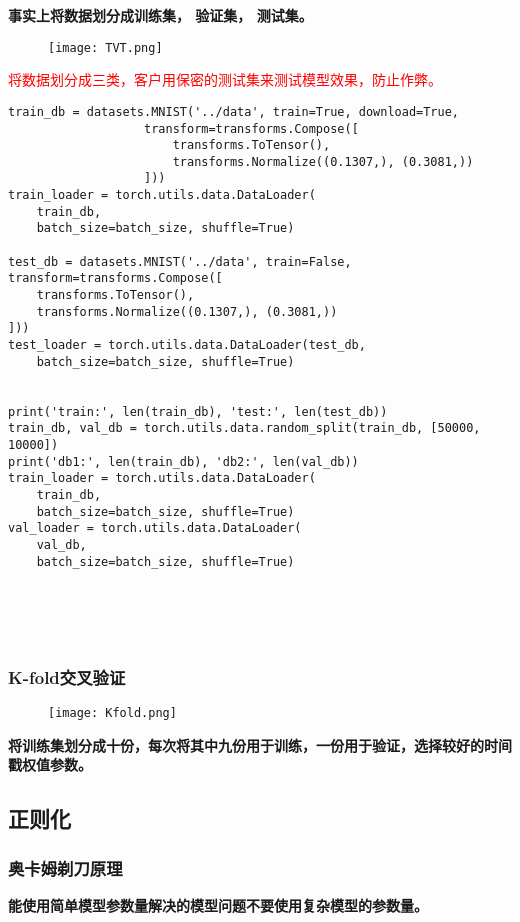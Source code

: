 \textbf{事实上将数据划分成训练集， 验证集， 测试集。}
\begin{figure}[!h]
  \centering
  \texttt{[image: TVT.png]}
\end{figure}

\textcolor{red}{将数据划分成三类，客户用保密的测试集来测试模型效果，防止作弊。}
\begin{lstlisting}
train_db = datasets.MNIST('../data', train=True, download=True,
                   transform=transforms.Compose([
                       transforms.ToTensor(),
                       transforms.Normalize((0.1307,), (0.3081,))
                   ]))
train_loader = torch.utils.data.DataLoader(
    train_db,
    batch_size=batch_size, shuffle=True)

test_db = datasets.MNIST('../data', train=False, transform=transforms.Compose([
    transforms.ToTensor(),
    transforms.Normalize((0.1307,), (0.3081,))
]))
test_loader = torch.utils.data.DataLoader(test_db,
    batch_size=batch_size, shuffle=True)


print('train:', len(train_db), 'test:', len(test_db))
train_db, val_db = torch.utils.data.random_split(train_db, [50000, 10000])
print('db1:', len(train_db), 'db2:', len(val_db))
train_loader = torch.utils.data.DataLoader(
    train_db,
    batch_size=batch_size, shuffle=True)
val_loader = torch.utils.data.DataLoader(
    val_db,
    batch_size=batch_size, shuffle=True)
\end{lstlisting}
~\\~\\~\\
\subsubsection{K-fold交叉验证}
\begin{figure}[!h]
  \centering
  \texttt{[image: Kfold.png]}
\end{figure}

\textbf{将训练集划分成十份，每次将其中九份用于训练，一份用于验证，选择较好的时间戳权值参数。}



\subsection{正则化}
\subsubsection{奥卡姆剃刀原理}
\textbf{能使用简单模型参数量解决的模型问题不要使用复杂模型的参数量。}

